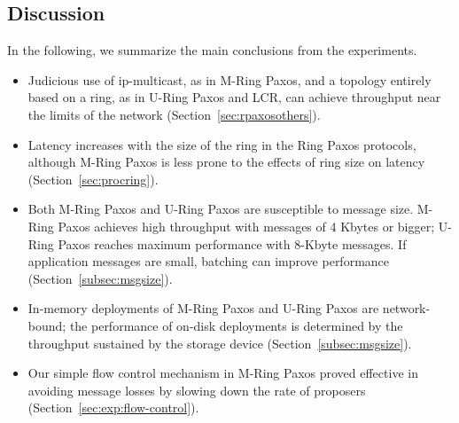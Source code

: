 \documentclass[final,3p,times,twocolumn,authoryear]{elsarticle}
\begin{document}
\subsection{Discussion}
\label{sec:exp:con}
In the following, we summarize the main conclusions from the experiments.

\begin{itemize}

\item Judicious use of ip-multicast, as in M-Ring Paxos, and a topology entirely based on a ring, as in U-Ring Paxos and LCR, can achieve throughput near the limits of the network (Section~\ref{sec:rpaxosothers}).

\item Latency increases with the size of the ring in the Ring Paxos protocols, although M-Ring Paxos is less prone to the effects of ring size on latency (Section~\ref{sec:procring}).

\item Both M-Ring Paxos and U-Ring Paxos are susceptible to message size. M-Ring Paxos achieves high throughput with messages of 4 Kbytes or bigger; U-Ring Paxos reaches maximum performance with 8-Kbyte messages.
If application messages are small, batching can improve performance (Section~\ref{subsec:msgsize}).

\item In-memory deployments of M-Ring Paxos and U-Ring Paxos are network-bound; the performance of on-disk deployments is determined by the throughput sustained by the storage device (Section~\ref{subsec:msgsize}).





\item Our simple flow control mechanism in M-Ring Paxos proved effective in avoiding message losses by slowing down the rate of proposers (Section~\ref{sec:exp:flow-control}).



\end{itemize}
\end{document}
